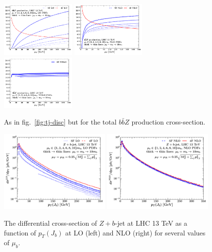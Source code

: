 \documentclass[letter,11pt]{article}
\def\mub{\mu_b}
\begin{document}
%
\begin{figure}[t]
\centering
\hskip-3pt
\includegraphics[trim=0.5cm 0.0cm 0.5cm 0.1cm,clip,width=0.33\textwidth]{./zbb_xs_mubdep_lo_lopdfs.pdf} \hskip-3pt
\includegraphics[trim=0.5cm 0.0cm 0.5cm 0.1cm,clip,width=0.33\textwidth]{./zbb_xs_mubdep_nlo_nlopdfs.pdf} \hskip-3pt
\includegraphics[trim=0.5cm 0.0cm 0.5cm 0.1cm,clip,width=0.33\textwidth]{./zbb_xs_mubdep_nnlo_nnlopdfs.pdf}
\caption{As in fig.~\ref{fig:tj-disc} but for the total $b\bar{b}Z$ production cross-section.}
\label{fig:zbb-xs-mub-dep}
\end{figure}
%
\begin{figure}[t]
\centering
\includegraphics[trim=0.2cm 0.0cm 0.4cm 0.1cm,clip,width=0.49\textwidth]{./zbj_xs_mubdep_lo_lopdfs.pdf} 
\includegraphics[trim=0.2cm 0.0cm 0.4cm 0.1cm,clip,width=0.49\textwidth]{./zbj_xs_mubdep_nlo_nlopdfs.pdf}
\caption{The differential cross-section of $Z+b$-jet at LHC 13 TeV as a function of $p_T(J_b)$ at LO (left) and NLO (right) for several values of $\mub$.}
\label{fig:zbj-xs-mub-dep}
\end{figure}
%
\end{document}
